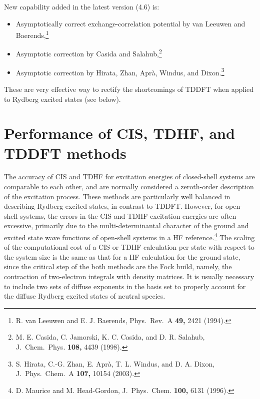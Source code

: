 New capability added in the latest version (4.6) is:
\begin{itemize}
\item Asymptotically correct exchange-correlation potential by van Leeuwen and Baerends,\footnote{R. van Leeuwen and E. J. Baerends, Phys.\ Rev.\ A {\bf 49,} 2421 (1994).}
\item Asymptotic correction by Casida and Salahub,\footnote{M. E. Casida, C. Jamorski, K. C. Casida, and D. R. Salahub, J.\ Chem.\ Phys. {\bf 108,} 4439 (1998).}
\item Asymptotic correction by Hirata, Zhan, Apr\`{a}, Windus, and Dixon.\footnote{S. Hirata, C.-G. Zhan, E. Apr\`{a}, T. L. Windus, and D. A. Dixon, J.\ Phys.\ Chem.\ A {\bf 107,} 10154 (2003).} 
\end{itemize}
These are very effective way to rectify the shortcomings of TDDFT when applied to Rydberg excited states (see below).

\section{Performance of CIS, TDHF, and TDDFT methods}

The accuracy of CIS and TDHF for excitation energies of closed-shell systems
are comparable to each other, and are normally considered a zeroth-order
description of the excitation process.  These methods are particularly well balanced
in describing Rydberg excited states, in contrast to TDDFT.
However, for open-shell systems,
the errors in the CIS and TDHF excitation energies are often excessive, primarily
due to the multi-determinantal character of the ground and excited state wave functions
of open-shell systems in a HF reference.\footnote{D. Maurice and M. Head-Gordon, J.\ Phys.\ Chem. {\bf 100,} 6131 (1996).} 
The scaling of the computational cost of a CIS
or TDHF calculation per state with respect to the system size is the same as that for 
a HF calculation for the ground state, since the critical step of the both methods are
the Fock build, namely, the contraction of two-electron integrals with density matrices.
It is usually necessary to include two sets of diffuse exponents in the basis set
to properly account for the diffuse Rydberg excited states of neutral species.

